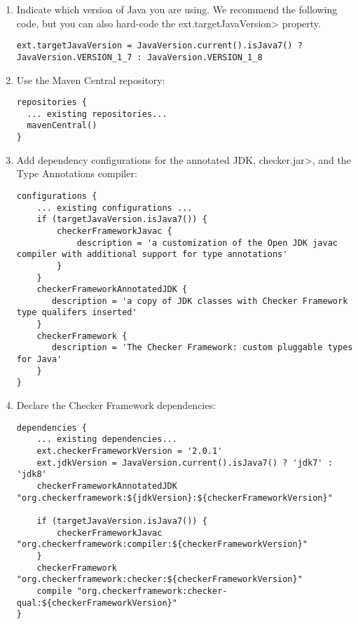 \begin{enumerate}

\item Indicate which version of Java you are using.  We recommend the
  following code, but you can also hard-code the \<ext.targetJavaVersion>
  property.

\begin{mysmall}
\begin{Verbatim}
ext.targetJavaVersion = JavaVersion.current().isJava7() ? JavaVersion.VERSION_1_7 : JavaVersion.VERSION_1_8
\end{Verbatim}
\end{mysmall}

\item Use the Maven Central repository:

\begin{Verbatim}
repositories {
  ... existing repositories...
  mavenCentral()
}
\end{Verbatim}

\item Add dependency configurations for the annotated JDK, \<checker.jar>, and the Type Annotations compiler:

\begin{mysmall}
\begin{Verbatim}
configurations {
    ... existing configurations ...
    if (targetJavaVersion.isJava7()) {
        checkerFrameworkJavac {
            description = 'a customization of the Open JDK javac compiler with additional support for type annotations'
        }
    }
    checkerFrameworkAnnotatedJDK {
       description = 'a copy of JDK classes with Checker Framework type qualifers inserted'
    }
    checkerFramework {
       description = 'The Checker Framework: custom pluggable types for Java'
    }
}
\end{Verbatim}
\end{mysmall}

\item Declare the Checker Framework dependencies:

\begin{Verbatim}
dependencies {
    ... existing dependencies...
    ext.checkerFrameworkVersion = '2.0.1'
    ext.jdkVersion = JavaVersion.current().isJava7() ? 'jdk7' : 'jdk8'
    checkerFrameworkAnnotatedJDK "org.checkerframework:${jdkVersion}:${checkerFrameworkVersion}"

    if (targetJavaVersion.isJava7()) {
        checkerFrameworkJavac "org.checkerframework:compiler:${checkerFrameworkVersion}"
    }
    checkerFramework "org.checkerframework:checker:${checkerFrameworkVersion}"
    compile "org.checkerframework:checker-qual:${checkerFrameworkVersion}"
}
\end{Verbatim}


\end{enumerate}

